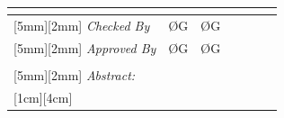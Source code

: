 \documentclass{sebase}
\begin{document}
\begin{tabular}{p{3cm}p{1.5cm}p{1.5cm}p{1.5cm}p{1.5cm}p{1.5cm}p{1.5cm}}
\multicolumn{1}{|c}{} & \multicolumn{1}{|c}{} & \multicolumn{1}{|c}{} & 
\multicolumn{1}{|c||}{} \\ \hline
\multicolumn{1}{||l}{%
\raisebox{0pt}[5mm][2mm]{}%
\emph{Checked By}} & \multicolumn{1}{|c}{\O G} & \multicolumn{1}{|c}{\O G} & 
\multicolumn{1}{|c}{} & \multicolumn{1}{|c}{} & \multicolumn{1}{|c}{} & 
\multicolumn{1}{|c||}{} \\ \hline
\multicolumn{1}{||l}{%
\raisebox{0pt}[5mm][2mm]{}%
\emph{Approved By}} & \multicolumn{1}{|c}{\O G} & \multicolumn{1}{|c}{\O G}
& \multicolumn{1}{|c}{} & \multicolumn{1}{|c}{} & \multicolumn{1}{|c}{} & 
\multicolumn{1}{|c||}{} \\ \hline\hline
&  &  &  &  &  &  \\ \hline\hline
\multicolumn{7}{||l||}{%
\raisebox{0pt}[5mm][2mm]{}%
\emph{Abstract:}} \\ 
\multicolumn{7}{||l||}{%
\raisebox{0pt}[1cm][4cm]{}%
%
%
}
\end{tabular}
\end{document}
